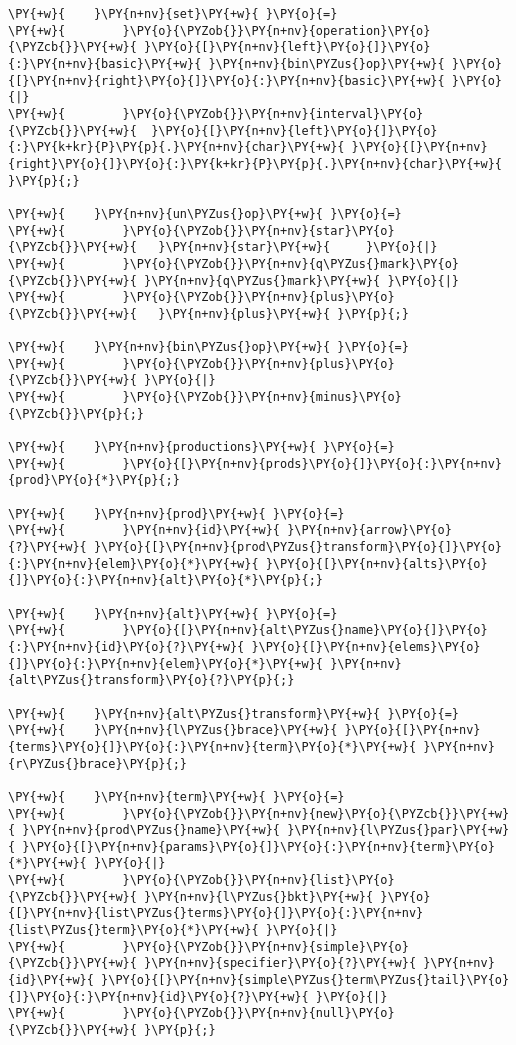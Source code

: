 \begin{Verbatim}[commandchars=\\\{\}]
\PY{+w}{    }\PY{n+nv}{set}\PY{+w}{ }\PY{o}{=}
\PY{+w}{        }\PY{o}{\PYZob{}}\PY{n+nv}{operation}\PY{o}{\PYZcb{}}\PY{+w}{ }\PY{o}{[}\PY{n+nv}{left}\PY{o}{]}\PY{o}{:}\PY{n+nv}{basic}\PY{+w}{ }\PY{n+nv}{bin\PYZus{}op}\PY{+w}{ }\PY{o}{[}\PY{n+nv}{right}\PY{o}{]}\PY{o}{:}\PY{n+nv}{basic}\PY{+w}{ }\PY{o}{|}
\PY{+w}{        }\PY{o}{\PYZob{}}\PY{n+nv}{interval}\PY{o}{\PYZcb{}}\PY{+w}{  }\PY{o}{[}\PY{n+nv}{left}\PY{o}{]}\PY{o}{:}\PY{k+kr}{P}\PY{p}{.}\PY{n+nv}{char}\PY{+w}{ }\PY{o}{[}\PY{n+nv}{right}\PY{o}{]}\PY{o}{:}\PY{k+kr}{P}\PY{p}{.}\PY{n+nv}{char}\PY{+w}{ }\PY{p}{;}

\PY{+w}{    }\PY{n+nv}{un\PYZus{}op}\PY{+w}{ }\PY{o}{=}
\PY{+w}{        }\PY{o}{\PYZob{}}\PY{n+nv}{star}\PY{o}{\PYZcb{}}\PY{+w}{   }\PY{n+nv}{star}\PY{+w}{ 	}\PY{o}{|}
\PY{+w}{        }\PY{o}{\PYZob{}}\PY{n+nv}{q\PYZus{}mark}\PY{o}{\PYZcb{}}\PY{+w}{ }\PY{n+nv}{q\PYZus{}mark}\PY{+w}{ }\PY{o}{|}
\PY{+w}{        }\PY{o}{\PYZob{}}\PY{n+nv}{plus}\PY{o}{\PYZcb{}}\PY{+w}{   }\PY{n+nv}{plus}\PY{+w}{	}\PY{p}{;}

\PY{+w}{    }\PY{n+nv}{bin\PYZus{}op}\PY{+w}{ }\PY{o}{=}
\PY{+w}{        }\PY{o}{\PYZob{}}\PY{n+nv}{plus}\PY{o}{\PYZcb{}}\PY{+w}{ }\PY{o}{|}
\PY{+w}{        }\PY{o}{\PYZob{}}\PY{n+nv}{minus}\PY{o}{\PYZcb{}}\PY{p}{;}

\PY{+w}{    }\PY{n+nv}{productions}\PY{+w}{ }\PY{o}{=}
\PY{+w}{        }\PY{o}{[}\PY{n+nv}{prods}\PY{o}{]}\PY{o}{:}\PY{n+nv}{prod}\PY{o}{*}\PY{p}{;}

\PY{+w}{    }\PY{n+nv}{prod}\PY{+w}{ }\PY{o}{=}
\PY{+w}{        }\PY{n+nv}{id}\PY{+w}{ }\PY{n+nv}{arrow}\PY{o}{?}\PY{+w}{ }\PY{o}{[}\PY{n+nv}{prod\PYZus{}transform}\PY{o}{]}\PY{o}{:}\PY{n+nv}{elem}\PY{o}{*}\PY{+w}{ }\PY{o}{[}\PY{n+nv}{alts}\PY{o}{]}\PY{o}{:}\PY{n+nv}{alt}\PY{o}{*}\PY{p}{;}

\PY{+w}{    }\PY{n+nv}{alt}\PY{+w}{ }\PY{o}{=}
\PY{+w}{        }\PY{o}{[}\PY{n+nv}{alt\PYZus{}name}\PY{o}{]}\PY{o}{:}\PY{n+nv}{id}\PY{o}{?}\PY{+w}{ }\PY{o}{[}\PY{n+nv}{elems}\PY{o}{]}\PY{o}{:}\PY{n+nv}{elem}\PY{o}{*}\PY{+w}{ }\PY{n+nv}{alt\PYZus{}transform}\PY{o}{?}\PY{p}{;}

\PY{+w}{    }\PY{n+nv}{alt\PYZus{}transform}\PY{+w}{ }\PY{o}{=}
\PY{+w}{	}\PY{n+nv}{l\PYZus{}brace}\PY{+w}{ }\PY{o}{[}\PY{n+nv}{terms}\PY{o}{]}\PY{o}{:}\PY{n+nv}{term}\PY{o}{*}\PY{+w}{ }\PY{n+nv}{r\PYZus{}brace}\PY{p}{;}

\PY{+w}{    }\PY{n+nv}{term}\PY{+w}{ }\PY{o}{=}
\PY{+w}{        }\PY{o}{\PYZob{}}\PY{n+nv}{new}\PY{o}{\PYZcb{}}\PY{+w}{ }\PY{n+nv}{prod\PYZus{}name}\PY{+w}{ }\PY{n+nv}{l\PYZus{}par}\PY{+w}{ }\PY{o}{[}\PY{n+nv}{params}\PY{o}{]}\PY{o}{:}\PY{n+nv}{term}\PY{o}{*}\PY{+w}{ }\PY{o}{|}
\PY{+w}{        }\PY{o}{\PYZob{}}\PY{n+nv}{list}\PY{o}{\PYZcb{}}\PY{+w}{ }\PY{n+nv}{l\PYZus{}bkt}\PY{+w}{ }\PY{o}{[}\PY{n+nv}{list\PYZus{}terms}\PY{o}{]}\PY{o}{:}\PY{n+nv}{list\PYZus{}term}\PY{o}{*}\PY{+w}{ }\PY{o}{|}
\PY{+w}{        }\PY{o}{\PYZob{}}\PY{n+nv}{simple}\PY{o}{\PYZcb{}}\PY{+w}{ }\PY{n+nv}{specifier}\PY{o}{?}\PY{+w}{ }\PY{n+nv}{id}\PY{+w}{ }\PY{o}{[}\PY{n+nv}{simple\PYZus{}term\PYZus{}tail}\PY{o}{]}\PY{o}{:}\PY{n+nv}{id}\PY{o}{?}\PY{+w}{ }\PY{o}{|}
\PY{+w}{        }\PY{o}{\PYZob{}}\PY{n+nv}{null}\PY{o}{\PYZcb{}}\PY{+w}{ }\PY{p}{;}


\end{Verbatim}

